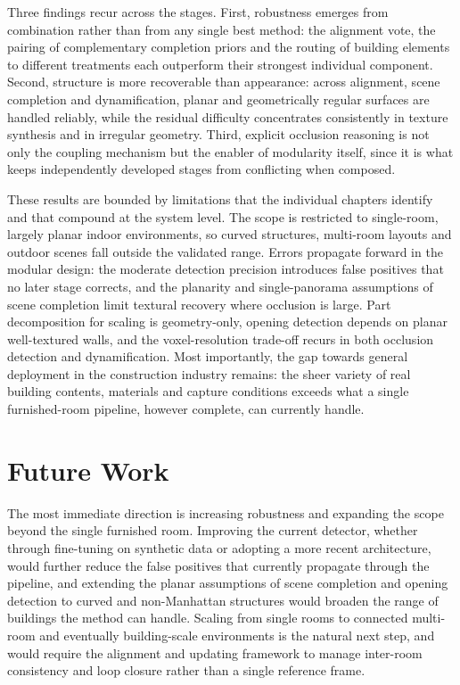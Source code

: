 Three findings recur across the stages. First, robustness emerges from combination rather than from any single best method: the alignment vote, the pairing of complementary completion priors and the routing of building elements to different treatments each outperform their strongest individual component. Second, structure is more recoverable than appearance: across alignment, scene completion and dynamification, planar and geometrically regular surfaces are handled reliably, while the residual difficulty concentrates consistently in texture synthesis and in irregular geometry. Third, explicit occlusion reasoning is not only the coupling mechanism but the enabler of modularity itself, since it is what keeps independently developed stages from conflicting when composed.

These results are bounded by limitations that the individual chapters identify and that compound at the system level. The scope is restricted to single-room, largely planar indoor environments, so curved structures, multi-room layouts and outdoor scenes fall outside the validated range. Errors propagate forward in the modular design: the moderate detection precision introduces false positives that no later stage corrects, and the planarity and single-panorama assumptions of scene completion limit textural recovery where occlusion is large. Part decomposition for scaling is geometry-only, opening detection depends on planar well-textured walls, and the voxel-resolution trade-off recurs in both occlusion detection and dynamification. Most importantly, the gap towards general deployment in the construction industry remains: the sheer variety of real building contents, materials and capture conditions exceeds what a single furnished-room pipeline, however complete, can currently handle.

\section{Future Work}
\label{sec:9_future_work}

The most immediate direction is increasing robustness and expanding the scope beyond the single furnished room. Improving the current detector, whether through fine-tuning on synthetic data or adopting a more recent architecture, would further reduce the false positives that currently propagate through the pipeline, and extending the planar assumptions of scene completion and opening detection to curved and non-Manhattan structures would broaden the range of buildings the method can handle. Scaling from single rooms to connected multi-room and eventually building-scale environments is the natural next step, and would require the alignment and updating framework to manage inter-room consistency and loop closure rather than a single reference frame.

